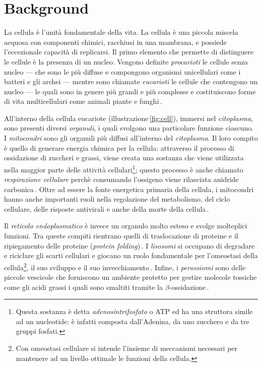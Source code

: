 \section{Background}

La cellula è l'unità fondamentale della vita. La cellula è una piccola miscela acquosa con componenti chimici, racchiusi in una mambrana, e possiede l'eccezionale capacità di replicarsi. Il primo elemento che permette di distinguere le cellule è la presenza di un nucleo. Vengono definite \textsl{procarioti} le cellule senza nucleo — che sono le più diffuse e compongono organismi unicellulari come i batteri e gli archei — mentre sono chiamate \textsl{eucarioti} le cellule che contengono un nucleo — le quali sono in genere più grandi e più complesse e costituiscono forme di vita multicellulari come animali piante e funghi\,\cite{alberts2015essential}.

All'interno della cellula eucariote (illustrazione\,\ref{fig:cell}), immersi nel \textsl{citoplasma}, sono presenti diversi \textsl{organuli}, i quali svolgono una particolare funzione ciascuno. I \textsl{mitocondri} sono gli organuli più diffusi all'interno del \textsl{citoplasma}. Il loro compito è quello di generare energia chimica per la cellula: attraverso il processo di ossidazione di zuccheri e grassi, viene creata una sostanza che viene utilizzata nella maggior parte delle attività cellulari\footnote{Questa sostanza è detta \textsl{adenosintrifosfato} o ATP ed ha una struttora simile ad un nucleotide: è infatti composta dall'Adenina, da uno zucchero e da tre gruppi fosfati.}; questo processo è anche chiamato \textsl{respirazione cellulare} perchè consumando l'ossigeno viene rilasciata anidride carbonica\,\cite{alberts2015essential, chinnery2003mitochondria}. Oltre ad essere la fonte energetica primaria della cellula, i mitocondri hanno anche importanti ruoli nella regolazione del metabolismo, del ciclo cellulare, delle risposte antivirali e anche della morte della cellula\,\cite{mcbride2006mitochondria}.

Il \textsl{reticolo endoplasmatico} è invece un organulo molto esteso e svolge molteplici funzioni. Tra queste compiti rientrano quelli di traslocazione di proteine e il ripiegamento delle proteine (\textsl{protein folding})\,\cite{alberts2015essential, voeltz2002structural}. I \textsl{lisosomi} si occupano di degradare e riciclare gli scarti cellulari e giocano un ruolo fondamentale per l'omeostasi della cellula\footnote{Con omeostasi cellulare si intende l'insieme di meccanismi necessari per mantenere ad un livello ottimale le funzioni della cellula.}, il suo sviluppo e il suo invecchiamento\,\cite{ballabio2016awesome, yang2021lysosome, dell2000lysosome}. Infine, i \textsl{perossiomi} sono delle piccole vescicole che forniscono un ambiente protetto per gestire molecole tossiche come gli acidi grassi i quali sono smaltiti tramite la $\beta$-ossidazione\,\cite{alberts2015essential, islinger2012peroxisome, islinger2018peroxisome}.

